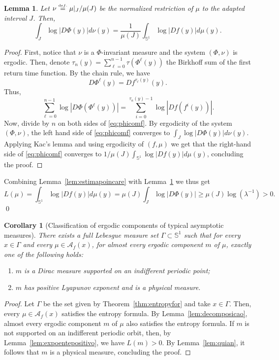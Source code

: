 \documentclass[12pt,a4paper,twoside]{article}
\theoremstyle{plain}
\newtheorem{lemma}[theorem]{Lemma}
\newtheorem{corollary}[theorem]{Corollary}
\theoremstyle{definition}
\newcommand{\T}{{\mathbb{S}^1}}
\newcommand{\cA}{{\mathcal A}}
\newcommand{\eqdef}{\stackrel{\scriptscriptstyle\textrm def.}{=}}
\begin{document}
\begin{lemma}
\label{lem:induzexpoente}
Let $\nu\eqdef\mu|_J/\mu(J)$ be the normalized restriction of $\mu$ to the adapted interval $J$. Then,
\[
\int_J\log|D\Phi(y)|d\nu(y)=\frac{1}{\mu(J)}\int_{\mathbb{S}^1}\log|Df(y)|d\mu(y).
\]
\end{lemma}
\begin{proof}
First, notice that $\nu$ is a $\Phi$-invariant measure and the system $(\Phi,\nu)$ is ergodic. Then, denote 
$\tau_n(y)=\sum_{\ell=0}^{n-1}\tau(\Phi^{\ell}(y))$ the Birkhoff sum of the first return time function. By the chain rule, we have
\[
D\Phi^\ell(y)=Df^{\tau_\ell(y)}(y).
\]
Thus, 
\begin{equation}
    \label{eq:phicomf}
    \sum_{\ell=0}^{n-1}\log|D\Phi(\Phi^\ell(y))|=\sum_{i=0}^{\tau_n(y)-1}\log|Df(f^i(y))|.
\end{equation}
Now, divide by $n$ on both sides of \eqref{eq:phicomf}. By ergodicity of the system $(\Phi,\nu)$, the left hand side of \eqref{eq:phicomf} converges to $\int_J\log|D\Phi(y)|d\nu(y)$. Applying Kac's lemma and using ergodicity of $(f,\mu)$ we get that the right-hand side of \eqref{eq:phicomf} converges to $1/\mu(J)\int_{\mathbb{S}^1}\log|Df(y)|d\mu(y)$, concluding the proof.
\end{proof}

Combining Lemma~\ref{lem:estimapoincare} with Lemma~\ref{lem:induzexpoente} we thus get 
\[
L(\mu)=\int_{\mathbb{S}^1}\log|Df(y)|d\mu(y)=\mu(J)\int_J\log|D\Phi(y)|\geq\mu(J)\log(\lambda^{-1})>0.
\]
\qed


\begin{corollary}[Classification of ergodic components of typical asymptotic measures]
There exists a full Lebesgue measure set $\Gamma\subset\T$ such that for every $x\in\Gamma$ and every $\mu\in\cA_f(x)$, for almost every ergodic component $m$ of $\mu$, exactly one of the following holds:
\begin{enumerate}
\item $m$ is a Dirac measure supported on an indifferent periodic point;
\item $m$ has positive Lyapunov exponent and is a physical measure.
\end{enumerate}
\end{corollary}
\begin{proof}
Let $\Gamma$ be the set given by Theorem~\ref{thm:entropyfor} and take $x\in\Gamma$. Then, every $\mu\in\cA_f(x)$ satisfies the entropy formula. By Lemma~\ref{lem:decomposicao}, almost every ergodic component $m$ of $\mu$ also satisfies the entropy formula. 
If $m$ is not supported on an indifferent periodic orbit, then, by Lemma~\ref{lem:expoentepositivo}, we have $L(m)>0$. By Lemma~\ref{lem:quian}, it follows that $m$ is a physical measure, concluding the proof. 
\end{proof}
\end{document}
